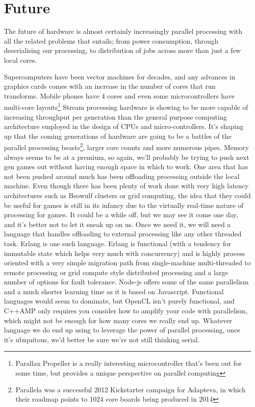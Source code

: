 \chapter{Future}

The future of hardware is almost certainly increasingly parallel processing
with all the related problems that entails; from power consumption, through
deserialising our processing, to distribution of jobs across more than just
a few local cores.

Supercomputers have been vector machines for decades, and any advances in
graphics cards comes with an increase in the number of cores that run
transforms. Mobile phones have 4 cores and even some microcontrollers have
multi-core layouts\footnote{Parallax Propeller is a really interesting
microcontroller that's been out for some time, but provides a unique
perspective on parallel computing} Stream processing hardware is showing to be
more capable of increasing throughput per generation than the general purpose
computing architecture employed in the design of CPUs and micro-controllers.
It's shaping up that the coming generations of hardware are going to be a
battles of the parallel processing beasts\footnote{Parallela was a successful
2012 Kickstarter campaign for Adapteva, in which their roadmap points to 1024
core boards being produced in 2014}, larger core counts and more numerous
pipes. Memory always seems to be at a premium, so again, we'll probably be
trying to push next gen games out without having enough space in which to work.
One area that has not been pushed around much has been offloading processing
outside the local machine. Even though there has been plenty of work done with
very high latency architectures such as Beowulf clusters or grid computing, the
idea that they could be useful for games is still in its infancy due to the
virtually real-time nature of processing for games. It could be a while off,
but we may see it come one day, and it's better not to let it sneak up on us.
Once we need it, we will need a language that handles offloading to external
processing like any other threaded task. Erlang is one such language. Erlang is
functional (with a tendency for immutable state which helps very much with
concurrency) and is highly process oriented with a very simple migration path
from single-machine multi-threaded to remote processing or grid compute style
distributed processing and a large number of options for fault tolerance.
Node-js offers some of the same parallelism and a much shorter learning time as
it is based on Javascript.  Functional languages would seem to dominate, but
OpenCL isn't purely functional, and C++AMP only requires you consider how to
amplify your code with parallelism, which might not be enough for how many
cores we really end up.  Whatever language we do end up using to leverage the
power of parallel processing, once it's ubiquitous, we'd better be sure we're
not still thinking serial. 

